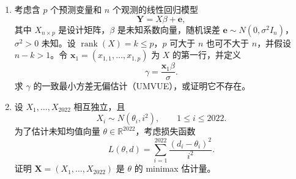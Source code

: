 \documentclass[UTF8,12pt]{ctexart}
\begin{document}
\begin{enumerate}[label=\textbf{\arabic*.},leftmargin=2.2em]
\item 考虑含 \(p\) 个预测变量和 \(n\) 个观测的线性回归模型
\[
\mathbf Y=X\beta+\mathbf e,
\]
其中 \(X_{n\times p}\) 是设计矩阵，\(\beta\) 是未知系数向量，随机误差 \(\mathbf e\sim N(0,\sigma^2I_n)\)，\(\sigma^2>0\) 未知。设 \(\operatorname{rank}(X)=k\le p\)，\(p\) 可大于 \(n\) 也可不大于 \(n\)，并假设 \(n-k>1\)。令 \(\mathbf x_1=(x_{1,1},\ldots,x_{1,p})\) 为 \(X\) 的第一行，并定义
\[
\gamma=\frac{\mathbf x_1\beta}{\sigma}.
\]
求 \(\gamma\) 的一致最小方差无偏估计（UMVUE），或证明它不存在。

\item 设 \(X_1,\ldots,X_{2022}\) 相互独立，且
\[
X_i\sim N(\theta_i,i^2),\qquad 1\le i\le2022.
\]
为了估计未知均值向量 \(\theta\in\mathbb R^{2022}\)，考虑损失函数
\[
L(\theta,d)=\sum_{i=1}^{2022}\frac{(d_i-\theta_i)^2}{i^2}.
\]
证明 \(\mathbf X=(X_1,\ldots,X_{2022})\) 是 \(\theta\) 的 minimax 估计量。
\end{enumerate}
\end{document}
